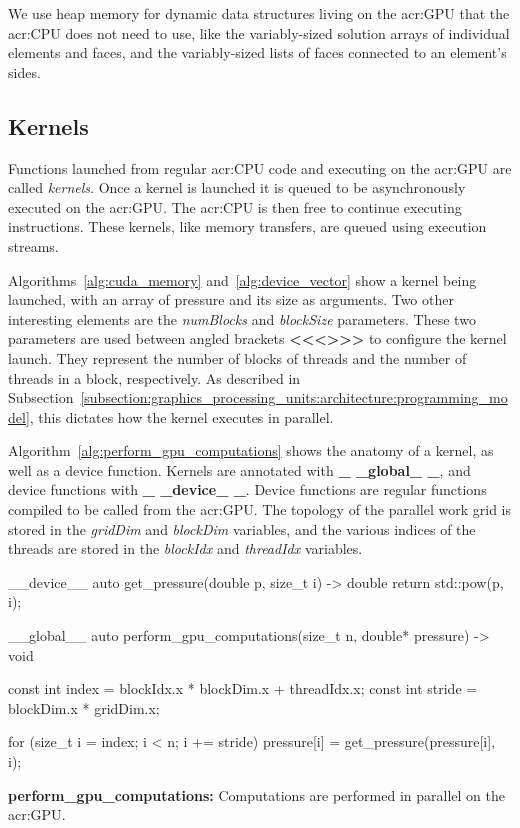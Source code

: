 We use heap memory for dynamic data structures living on the \acrshort{acr:GPU} that the
\acrshort{acr:CPU} does not need to use, like the variably-sized solution arrays of individual
elements and faces, and the variably-sized lists of faces connected to an element's sides.

\subsection{Kernels}\label{subsection:graphics_processing_units:implementation:kernels}

Functions launched from regular \acrshort{acr:CPU} code and executing on the \acrshort{acr:GPU} are
called \textit{kernels}. Once a kernel is launched it is queued to be asynchronously executed on the
\acrshort{acr:GPU}. The \acrshort{acr:CPU} is then free to continue executing instructions. These
kernels, like memory transfers, are queued using execution streams.

Algorithms~\ref{alg:cuda_memory} and~\ref{alg:device_vector} show a kernel being launched, with an
array of pressure and its size as arguments. Two other interesting elements are the
\textit{numBlocks} and \textit{blockSize} parameters. These two parameters are used between angled
brackets \textbf{<\negmedspace<\negmedspace<\thickspace>\negmedspace>\negmedspace>} to
configure the kernel launch. They represent the number of blocks of threads and the number of
threads in a block, respectively. As described in
Subsection~\ref{subsection:graphics_processing_units:architecture:programming_model}, this dictates
how the kernel executes in parallel.

Algorithm~\ref{alg:perform_gpu_computations} shows the anatomy of a kernel, as well as a device
function. Kernels are annotated with \textbf{\_ \_global\_ \_}, and device functions with
\textbf{\_ \_device\_ \_}. Device functions are regular functions compiled to be called from the
\acrshort{acr:GPU}. The topology of the parallel work grid is stored in the \textit{gridDim} and
\textit{blockDim} variables, and the various indices of the threads are stored in the
\textit{blockIdx} and \textit{threadIdx} variables.

\begin{algorithm}[H]
    \begin{cuda}
        __device__ 
        auto get_pressure(double p, size_t i) -> double {
            return std::pow(p, i);
        }

        __global__
        auto perform_gpu_computations(size_t n, double* pressure) -> void {
            const int index = blockIdx.x * blockDim.x + threadIdx.x;
            const int stride = blockDim.x * gridDim.x;

            for (size_t i = index; i < n; i += stride) {
                pressure[i] = get_pressure(pressure[i], i);
            }
        }\end{cuda}
\caption{\textbf{perform\_gpu\_computations:} Computations are performed in parallel on the \acrshort{acr:GPU}.}\label{alg:perform_gpu_computations}
\end{algorithm}

